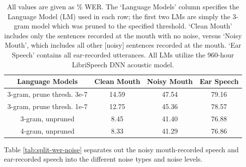 \begin{table}[h]
\begin{center}
\begin{tabular}{| c || c | c | c |} \hline
Language Models & Clean Mouth & Noisy Mouth & Ear Speech \\ \hline\hline
3-gram, prune thresh. 3e-7 & 14.59 & 47.54 & 79.16 \\ \hline
3-gram, prune thresh. 1e-7 & 12.75 & 45.36 & 78.57 \\ \hline
3-gram, unpruned & 8.45 & 41.40 & 76.88 \\ \hline
4-gram, unpruned & 8.33 & 41.29 & 76.86 \\ \hline
\end{tabular}
\end{center}
\caption{All values are given as \% WER. The `Language Models' column specifies the Language Model (LM) used in each row; the first two LMs are simply the 3-gram model which was pruned to the specified threshold.  `Clean Mouth' includes only the sentences recorded at the mouth with no noise, versus `Noisy Mouth', which includes all other [noisy] sentences recorded at the mouth. `Ear Speech' contains all ear-recorded utterances.  All LMs utilize the 960-hour LibriSpeech DNN acoustic model.}\label{tab:basic-run}
\end{table}

% 

Table \ref{tab:split-wer-noise} separates out the noisy mouth-recorded speech and ear-recorded speech into the different noise types and noise levels.

